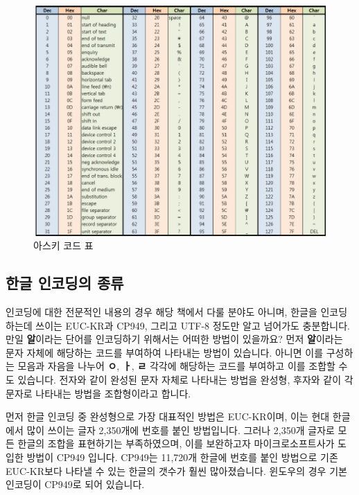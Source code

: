 \documentclass[]{book}
\begin{document}
\begin{figure}

{\centering \includegraphics{images/ascii_code} 

}

\caption{아스키 코드 표}\label{fig:unnamed-chunk-1}
\end{figure}

\hypertarget{section-5}{%
\subsection{한글 인코딩의 종류}\label{section-5}}

인코딩에 대한 전문적인 내용의 경우 해당 책에서 다룰 분야도 아니며, 한글을 인코딩하는데 쓰이는 EUC-KR과 CP949, 그리고 UTF-8 정도만 알고 넘어가도 충분합니다. 만일 \textbf{알}이라는 단어를 인코딩하기 위해서는 어떠한 방법이 있을까요? 먼저 \textbf{알}이라는 문자 자체에 해당하는 코드를 부여하여 나타내는 방법이 있습니다. 아니면 이를 구성하는 모음과 자음을 나누어 \textbf{ㅇ}, \textbf{ㅏ}, \textbf{ㄹ} 각각에 해당하는 코드를 부여하고 이를 조합할 수도 있습니다. 전자와 같이 완성된 문자 자체로 나타내는 방법을 완성형, 후자와 같이 각 문자로 나타내는 방법을 조합형이라고 합니다.

먼저 한글 인코딩 중 완성형으로 가장 대표적인 방법은 EUC-KR이며, 이는 현대 한글에서 많이 쓰이는 글자 2,350개에 번호를 붙인 방법입니다. 그러나 2,350개 글자로 모든 한글의 조합을 표현하기는 부족하였으며, 이를 보완하고자 마이크로소프트사가 도입한 방법이 CP949 입니다. CP949는 11,720개 한글에 번호를 붙인 방법으로 기존 EUC-KR보다 나타낼 수 있는 한글의 갯수가 훨씬 많아졌습니다. 윈도우의 경우 기본 인코딩이 CP949로 되어 있습니다.
\end{document}
